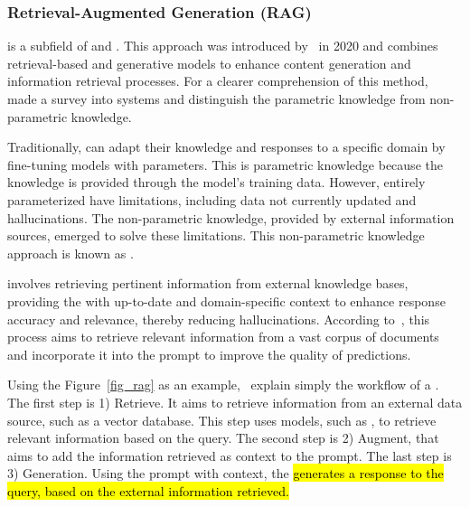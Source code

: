 \subsubsection{Retrieval-Augmented Generation (RAG)}
\label{rag_section}

{\rag} is a subfield of {\nlp} and {\ai}. This approach was introduced by~\citet{lewis_retrieval-augmented_2020} in 2020 and combines retrieval-based and generative models to enhance content generation and information retrieval processes. For a clearer comprehension of this method,~\citet{gao_retrieval-augmented_2023} made a survey into {\rag} systems and distinguish the parametric knowledge from non-parametric knowledge. 

Traditionally, {\llm} can adapt their knowledge and responses to a specific domain by fine-tuning models with parameters. This is parametric knowledge because the {\llm} knowledge is provided through the model's training data. However, entirely parameterized {\llm} have limitations, including data not currently updated and hallucinations. The non-parametric knowledge, provided by external information sources, emerged to solve these limitations. This non-parametric knowledge approach is known as {\rag}. 

{\rag} involves retrieving pertinent information from external knowledge bases, providing the {\llm} with up-to-date and domain-specific context to enhance response accuracy and relevance, thereby reducing hallucinations. According to~\citet{lewis_retrieval-augmented_2020}, this process aims to retrieve relevant information from a vast corpus of documents and incorporate it into the prompt to improve the quality of predictions.

Using the Figure~\ref{fig_rag} as an example,~\citet{gao_retrieval-augmented_2023} explain simply the workflow of a {\rag}. The first step is 1) Retrieve. It aims to retrieve information from an external data source, such as a vector database. This step uses {\ir} models, such as {\bm}, to retrieve relevant information based on the query. The second step is 2) Augment, that aims to add the information retrieved as context to the {\llm} prompt. The last step is 3) Generation. Using the prompt with context, the {\llm} \hl{generates a response to the query, based on the external information retrieved.}


